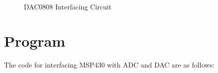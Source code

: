 \documentclass[12pt, letterpaper]{article}
\begin{document}
\begin{figure}[t]
	\centering
	\caption{DAC0808 Interfacing Circuit}
	\label{fig:DAC}
\end{figure}


\section{Program}

The code for interfacing MSP430 with ADC and DAC are as follows:
\end{document}
